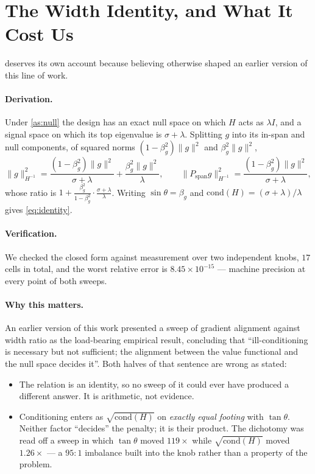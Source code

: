 \section{The Width Identity, and What It Cost Us}
\label{app:identity}

 deserves its own account because believing otherwise shaped an
earlier version of this line of work.

\paragraph{Derivation.} Under \cref{as:null} the design has an exact null space on
which $H$ acts as $\lambda I$, and a signal space on which its top eigenvalue is
$\sigma + \lambda$. Splitting $g$ into its in-span and null components, of squared
norms $(1-\beta_g^2)\lVert g\rVert^2$ and $\beta_g^2 \lVert g\rVert^2$,
\[
\lVert g\rVert_{H^{-1}}^2
= \frac{(1-\beta_g^2)\lVert g\rVert^2}{\sigma+\lambda}
+ \frac{\beta_g^2\lVert g\rVert^2}{\lambda},
\qquad
\lVert P_{\mathrm{span}} g\rVert_{H^{-1}}^2
= \frac{(1-\beta_g^2)\lVert g\rVert^2}{\sigma+\lambda},
\]
whose ratio is
$1 + \frac{\beta_g^2}{1-\beta_g^2}\cdot\frac{\sigma+\lambda}{\lambda}$. Writing
$\sin\theta = \beta_g$ and $\mathrm{cond}(H) = (\sigma+\lambda)/\lambda$ gives
\cref{eq:identity}.

\paragraph{Verification.} We checked the closed form against measurement over two
independent knobs, $17$ cells in total, and the worst relative error is
$8.45\times10^{-15}$ --- machine precision at every point of both sweeps.

\paragraph{Why this matters.} An earlier version of this work presented a sweep of
gradient alignment against width ratio as the load-bearing empirical result,
concluding that ``ill-conditioning is necessary but not sufficient; the alignment
between the value functional and the null space decides it''. Both halves of that
sentence are wrong as stated:

\begin{itemize}
\item The relation is an identity, so no sweep of it could ever have produced a
different answer. It is arithmetic, not evidence.
\item Conditioning enters as $\sqrt{\mathrm{cond}(H)}$ on \emph{exactly equal
footing} with $\tan\theta$. Neither factor ``decides'' the penalty; it is their
product. The dichotomy was read off a sweep in which $\tan\theta$ moved $119\times$
while $\sqrt{\mathrm{cond}(H)}$ moved $1.26\times$ --- a $95{:}1$ imbalance built
into the knob rather than a property of the problem.
\end{itemize}

